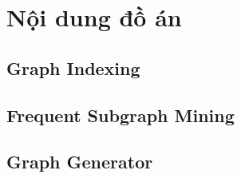 \section{Nội dung đồ án}
\subsection{Graph Indexing}

\subsection{Frequent Subgraph Mining}

\subsection{Graph Generator}
